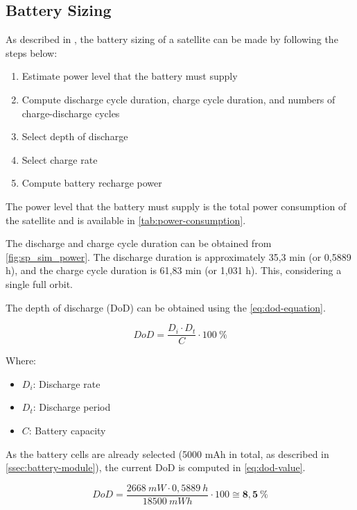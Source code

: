 \subsection{Battery Sizing}

As described in \cite{larson2005}, the battery sizing of a satellite can be made by following the steps below:

\begin{enumerate}
    \item Estimate power level that the battery must supply
    \item Compute discharge cycle duration, charge cycle duration, and numbers of charge-discharge cycles
    \item Select depth of discharge
    \item Select charge rate
    \item Compute battery recharge power
\end{enumerate}

The power level that the battery must supply is the total power consumption of the satellite and is available in \autoref{tab:power-consumption}.

The discharge and charge cycle duration can be obtained from \autoref{fig:sp_sim_power}. The discharge duration is approximately 35,3 min (or 0,5889 h), and the charge cycle duration is 61,83 min (or 1,031 h). This, considering a single full orbit.

The depth of discharge (DoD) can be obtained using the \autoref{eq:dod-equation}.

\begin{equation} \label{eq:dod-equation}
    DoD = \frac{D_{i} \cdot D_{t}}{C} \cdot 100\ \%
\end{equation}

Where:

\begin{itemize}
    \item $D_{i}$: Discharge rate
    \item $D_{t}$: Discharge period
    \item $C$: Battery capacity
\end{itemize}

As the battery cells are already selected (5000 mAh in total, as described in \autoref{ssec:battery-module}), the current DoD is computed in \autoref{eq:dod-value}.

\begin{equation} \label{eq:dod-value}
    DoD = \frac{2668\ mW \cdot 0,5889\ h}{18500\ mWh} \cdot 100 \cong \mathbf{8,5\ \%}
\end{equation}

